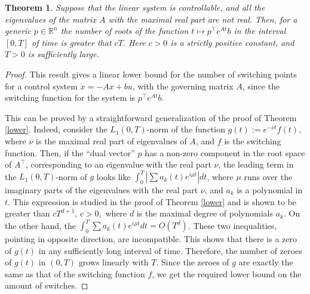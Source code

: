 \documentclass[10pt,a4paper]{amsart}
\newtheorem{theorem}{Theorem}
\newcommand {\R}{\mathbb R}
\begin{document}
 \begin{theorem}\label{imaginary}
Suppose that the linear system is controllable, and all the eigenvalues of the matrix $A$ with the maximal real part  are not real. Then, for a generic $ p\in\R^n$ the number of roots of the function $t\mapsto p^\top e^{At}b$ in the interval $[0,T]$ of time is greater that $cT$. Here $c>0$ is a strictly positive constant, and $T>0$ is sufficiently large.
\end{theorem}

\begin{proof}
 This result gives a linear lower bound for the number of switching points for a control system $\dot x=-Ax+bu$, with the governing matrix $A$, since the switching function for the system  is $p^\top e^{At}b$.

This can be proved by a straightforward generalization of the proof of Theorem \ref{lower}. Indeed, consider the $L_1(0,T)$-norm of the function $g(t):=e^{-\nu t}f(t)$, where $\nu$ is the maximal real part of eigenvalues of $A$, and $f$ is the switching function. Then, if the ``dual vector'' $p$ has a non-zero component in the root space of $A^\top$, corresponding to an eigenvalue with the real part $\nu$,   the leading term in  the $L_1(0,T)$-norm of $g$ looks like $\int_0^T|\sum a_k(t)e^{i\mu t}|dt$, where $\mu$ runs over the imaginary parts of the eigenvalues with the real part $\nu$, and $a_k$ is a polynomial in $t$. This expression is studied in the proof of Theorem \ref{lower} and is shown to be greater than $ cT^{d+1},\, c>0,$ where $d$ is the maximal degree of polynomials $a_k$. On the other hand, the $\int_0^T\sum a_k(t)e^{i\mu t}dt=O(T^d)$. These two inequalities, pointing in opposite direction, are incompatible. This  shows that there is a zero of $g(t)$ in any sufficiently long interval of time.  Therefore, the number of zeroes of $g(t)$ in $(0,T)$ grows linearly with $T$. Since the zeroes of $g$ are exactly the same as that of the switching function $f$, we get the required lower bound on the amount of switches. \end{proof}
\end{document}

